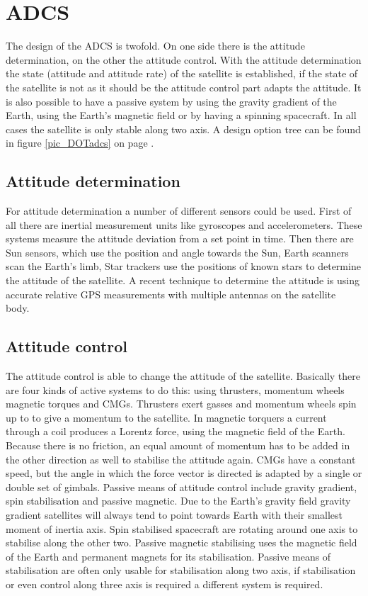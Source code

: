 \section{ADCS}
\label{sect_adcs}
The design of the \ac{ADCS} is twofold. On one side there is the attitude determination, on the other the attitude control. With the attitude determination the state (attitude and attitude rate) of the satellite is established, if the state of the satellite is not as it should be the attitude control part adapts the attitude. It is also possible to have a passive system by using the gravity gradient of the Earth, using the Earth's magnetic field or by having a spinning spacecraft. In all cases the satellite is only stable along two axis. A design option tree can be found in figure \ref{pic_DOTadcs} on page \pageref{pic_DOTadcs}.

\subsection{Attitude determination}
For attitude determination a number of different sensors could be used. First of all there are inertial measurement units like gyroscopes and accelerometers. These systems measure the attitude deviation from a set point in time. Then there are Sun sensors, which use the position and angle towards the Sun,  Earth scanners scan the Earth's limb, Star trackers use the positions of known stars to determine the attitude of the satellite. A recent technique to determine the attitude is using accurate relative \ac{GPS} measurements with multiple antennas on the satellite body.

\subsection{Attitude control}
The attitude control is able to change the attitude of the satellite. Basically there are four kinds of active systems to do this: using thrusters, momentum wheels magnetic torques and \acp{CMG}. Thrusters exert gasses and momentum wheels spin up to to give a momentum to the satellite. In magnetic torquers a current through a coil produces a Lorentz force, using the magnetic field of the Earth. Because there is no friction, an equal amount of momentum has to be added in the other direction as well to stabilise the attitude again. \ac{CMG}s have a constant speed, but the angle in which the force vector is directed is adapted by a single or double set of gimbals. Passive means of attitude control include gravity gradient, spin stabilisation and passive magnetic. Due to the Earth's gravity field gravity gradient satellites will always tend to point towards Earth with their smallest moment of inertia axis. Spin stabilised spacecraft are rotating around one axis to stabilise along the other two. Passive magnetic stabilising uses the magnetic field of the Earth and permanent magnets for its stabilisation. Passive means of stabilisation are often only usable for stabilisation along two axis, if stabilisation or even control along three axis is required a different system is required.

